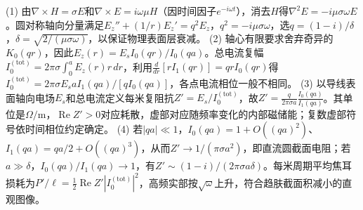 (1) 由\(\nabla\times H=\sigma E\)和\(\nabla\times E=i\omega\mu H\)（因时间因子\(e^{-i\omega t}\)），消去\(H\)得\(\nabla^2E=-i\mu\sigma\omega E\)。圆对称轴向分量满足\(E_z''+(1/r)E_z'=q^2E_z\)，\(q^2=-i\mu\sigma\omega\)，选\(q=(1-i)/\delta\)，\(\delta=\sqrt{2/(\mu\sigma\omega)}\)，以保证物理表面层衰减。
(2) 轴心有限要求舍弃奇异的\(K_0(qr)\)，因此\(E_z(r)=E_s I_0(qr)/I_0(qa)\)。总电流复幅\(I_0^{(\mathrm{tot})}=2\pi\sigma\int_0^a E_z(r)r\,dr\)，利用\(\frac{d}{dr}[rI_1(qr)]=qrI_0(qr)\)得\(I_0^{(\mathrm{tot})}=2\pi\sigma E_sa I_1(qa)/[qI_0(qa)]\)，各点电流相位一般不相同。
(3) 以导线表面轴向电场\(E_s\)和总电流定义每米复阻抗\(Z'=E_s/I_0^{(\mathrm{tot})}\)，故\(Z'=\frac q{2\pi\sigma a}\frac{I_0(qa)}{I_1(qa)}\)。其单位是\(\Omega/\mathrm m\)，\(\operatorname{Re}Z'>0\)对应耗散，虚部对应随频率变化的内部磁储能；复数虚部符号依时间相位约定确定。
(4) 若\(|qa|\ll1\)，\(I_0(qa)=1+O((qa)^2)\)、\(I_1(qa)=qa/2+O((qa)^3)\)，从而\(Z'\to1/(\pi\sigma a^2)\)，即直流圆截面电阻；若\(a\gg\delta\)，\(I_0(qa)/I_1(qa)\to1\)，有\(Z'\sim(1-i)/(2\pi\sigma a\delta)\)。每米周期平均焦耳损耗为\(P'/\ell=\tfrac12\operatorname{Re}Z'|I_0^{(\mathrm{tot})}|^2\)，高频实部按\(\sqrt\omega\)上升，符合趋肤截面积减小的直观图像。
